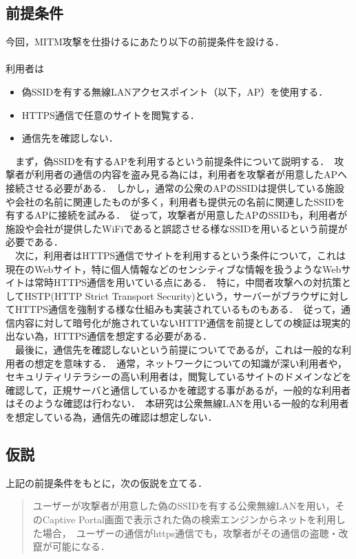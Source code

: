 \documentclass[dvipdfmx]{jsarticle}
\begin{document}
        \subsection{前提条件}
            今回，MITM攻撃を仕掛けるにあたり以下の前提条件を設ける．\\
            \\
            利用者は
            \begin{itemize}
                \item 偽SSIDを有する無線LANアクセスポイント（以下，AP）を使用する．
                \item HTTPS通信で任意のサイトを閲覧する．
                \item 通信先を確認しない．
            \end{itemize}
            　まず，偽SSIDを有するAPを利用するという前提条件について説明する．\
            攻撃者が利用者の通信の内容を盗み見る為には，利用者を攻撃者が用意したAPへ接続させる必要がある．\
            しかし，通常の公衆のAPのSSIDは提供している施設や会社の名前に関連したものが多く，利用者も提供元の名前に関連したSSIDを有するAPに接続を試みる．\
            従って，攻撃者が用意したAPのSSIDも，利用者が施設や会社が提供したWiFiであると誤認させる様なSSIDを用いるという前提が必要である．\\
            　次に，利用者はHTTPS通信でサイトを利用するという条件について，これは現在のWebサイト，特に個人情報などのセンシティブな情報を扱うようなWebサイトは常時HTTPS通信を用いている点にある．\
            特に，中間者攻撃への対抗策としてHSTP(HTTP Strict Transport Security)という，サーバーがブラウザに対してHTTPS通信を強制する様な仕組みも実装されているものもある．\
            従って，通信内容に対して暗号化が施されていないHTTP通信を前提としての検証は現実的出ない為，HTTPS通信を想定する必要がある．\\
            　最後に，通信先を確認しないという前提についてであるが，これは一般的な利用者の想定を意味する．\
            通常，ネットワークについての知識が深い利用者や，セキュリティリテラシーの高い利用者は，閲覧しているサイトのドメインなどを確認して，正規サーバと通信しているかを確認する事があるが，一般的な利用者はそのような確認は行わない．\
            本研究は公衆無線LANを用いる一般的な利用者を想定している為，通信先の確認は想定しない．\\
        \subsection{仮説}
            上記の前提条件をもとに，次の仮説を立てる．
            \begin{quote}
                ユーザーが攻撃者が用意した偽のSSIDを有する公衆無線LANを用い，そのCaptive Portal画面で表示された偽の検索エンジンからネットを利用した場合，\
                ユーザーの通信がhttps通信でも，攻撃者がその通信の盗聴・改竄が可能になる．
            \end{quote}
\end{document}
